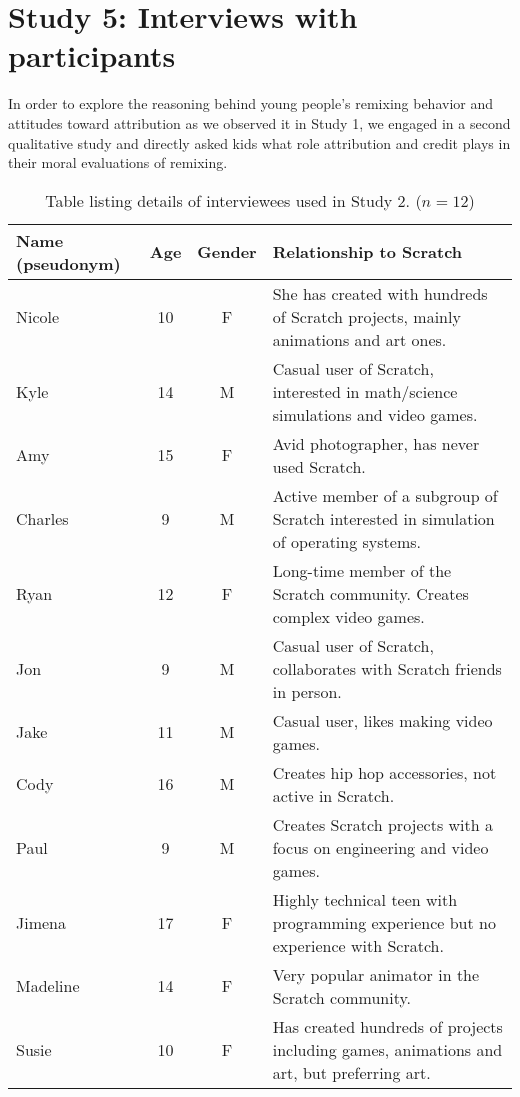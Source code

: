 \section{Study 5: Interviews with participants}

In order to explore the reasoning behind young people's remixing
behavior and attitudes toward attribution as we observed it in Study
1, we engaged in a second qualitative study and directly asked kids
what role attribution and credit plays in their moral evaluations of
remixing.

\begin{table*} \begin{tabular}{lccp{4.5in}} \hline
\textbf{Name (pseudonym)} & \textbf{Age} & \textbf{Gender} & \textbf{Relationship to Scratch}\\
\hline
Nicole & 10 & F & She has created with hundreds of Scratch projects, mainly animations and art ones. \\
Kyle & 14 & M & Casual user of Scratch, interested in math/science simulations and video games. \\
Amy & 15 & F & Avid photographer, has never used Scratch. \\
Charles & 9 & M & Active member of a subgroup of Scratch interested in simulation of operating systems.  \\
Ryan & 12 & F & Long-time member of the Scratch community. Creates complex video games. \\
Jon & 9 & M & Casual user of Scratch, collaborates with Scratch friends in person. \\
Jake & 11 & M & Casual user, likes making video games. \\
Cody & 16 & M & Creates hip hop accessories, not active in Scratch. \\
Paul & 9 & M & Creates Scratch projects with a focus on engineering and video games. \\
Jimena & 17 & F & Highly technical teen with programming experience but no experience with Scratch. \\
Madeline & 14 & F & Very popular animator  in the Scratch community. \\
Susie & 10 & F & Has created hundreds of projects including games, animations and art, but preferring art. \\
\hline
\end{tabular} \caption{Table listing details of interviewees used in Study 2. ($n=12$)} \label{tab:ints} \end{table*}

